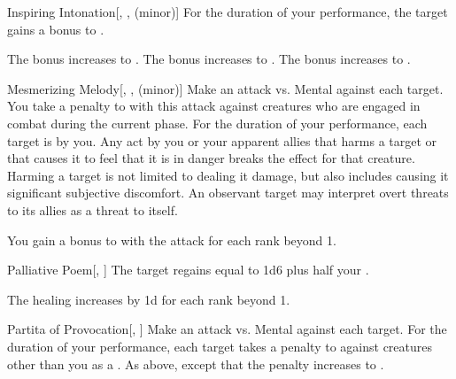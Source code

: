 {\begin{freeability}{Inspiring Intonation}[, ,  (minor)]
                For the duration of your performance, the target gains a  bonus to .

                \rankline
                 The bonus increases to .
                 The bonus increases to .
                 The bonus increases to .
            \end{freeability}

            \begin{freeability}{Mesmerizing Melody}[, ,  (minor)]
                Make an attack vs. Mental against each target.
                You take a  penalty to  with this attack against creatures who are engaged in combat during the current phase.
                \hit For the duration of your performance, each target is \fascinated by you.
                Any act by you or your apparent allies that harms a target or that causes it to feel that it is in danger breaks the effect for that creature.
                Harming a target is not limited to dealing it damage, but also includes causing it significant subjective discomfort.
                An observant target may interpret overt threats to its allies as a threat to itself.

                \rankline
                You gain a  bonus to  with the attack for each rank beyond 1.
            \end{freeability}

            \begin{freeability}{Palliative Poem}[, ]
                The target regains  equal to 1d6 plus half your .

                \rankline
                The healing increases by \plus1d for each rank beyond 1.
            \end{freeability}

            \begin{freeability}{Partita of Provocation}[, ]
                Make an attack vs. Mental against each target.
                \hit For the duration of your performance, each target takes a  penalty to  against creatures other than you as a .
                \crit As above, except that the penalty increases to .


\end{freeability}}
